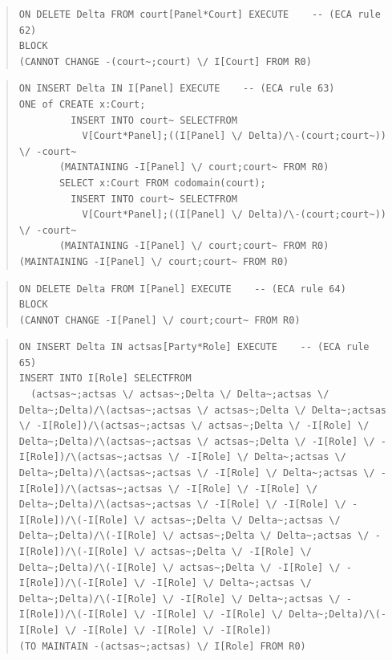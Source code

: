 \documentclass[10pt,a4paper]{report}              %
\theoremstyle{plain}\theorembodyfont{\rmfamily}\newtheorem{definition}{Definition}[section]
\theoremstyle{plain}\theorembodyfont{\rmfamily}\newtheorem{designrule}[definition]{Requirement}
\begin{document}
\begin{quote}
\begin{verbatim}
ON DELETE Delta FROM court[Panel*Court] EXECUTE    -- (ECA rule 62)
BLOCK
(CANNOT CHANGE -(court~;court) \/ I[Court] FROM R0)
\end{verbatim}
\end{quote}
\begin{quote}
\begin{verbatim}
ON INSERT Delta IN I[Panel] EXECUTE    -- (ECA rule 63)
ONE of CREATE x:Court;
         INSERT INTO court~ SELECTFROM
           V[Court*Panel];((I[Panel] \/ Delta)/\-(court;court~)) \/ -court~
       (MAINTAINING -I[Panel] \/ court;court~ FROM R0)
       SELECT x:Court FROM codomain(court);
         INSERT INTO court~ SELECTFROM
           V[Court*Panel];((I[Panel] \/ Delta)/\-(court;court~)) \/ -court~
       (MAINTAINING -I[Panel] \/ court;court~ FROM R0)
(MAINTAINING -I[Panel] \/ court;court~ FROM R0)
\end{verbatim}
\end{quote}
\begin{quote}
\begin{verbatim}
ON DELETE Delta FROM I[Panel] EXECUTE    -- (ECA rule 64)
BLOCK
(CANNOT CHANGE -I[Panel] \/ court;court~ FROM R0)
\end{verbatim}
\end{quote}
\begin{quote}
\begin{verbatim}
ON INSERT Delta IN actsas[Party*Role] EXECUTE    -- (ECA rule 65)
INSERT INTO I[Role] SELECTFROM
  (actsas~;actsas \/ actsas~;Delta \/ Delta~;actsas \/ Delta~;Delta)/\(actsas~;actsas \/ actsas~;Delta \/ Delta~;actsas \/ -I[Role])/\(actsas~;actsas \/ actsas~;Delta \/ -I[Role] \/ Delta~;Delta)/\(actsas~;actsas \/ actsas~;Delta \/ -I[Role] \/ -I[Role])/\(actsas~;actsas \/ -I[Role] \/ Delta~;actsas \/ Delta~;Delta)/\(actsas~;actsas \/ -I[Role] \/ Delta~;actsas \/ -I[Role])/\(actsas~;actsas \/ -I[Role] \/ -I[Role] \/ Delta~;Delta)/\(actsas~;actsas \/ -I[Role] \/ -I[Role] \/ -I[Role])/\(-I[Role] \/ actsas~;Delta \/ Delta~;actsas \/ Delta~;Delta)/\(-I[Role] \/ actsas~;Delta \/ Delta~;actsas \/ -I[Role])/\(-I[Role] \/ actsas~;Delta \/ -I[Role] \/ Delta~;Delta)/\(-I[Role] \/ actsas~;Delta \/ -I[Role] \/ -I[Role])/\(-I[Role] \/ -I[Role] \/ Delta~;actsas \/ Delta~;Delta)/\(-I[Role] \/ -I[Role] \/ Delta~;actsas \/ -I[Role])/\(-I[Role] \/ -I[Role] \/ -I[Role] \/ Delta~;Delta)/\(-I[Role] \/ -I[Role] \/ -I[Role] \/ -I[Role])
(TO MAINTAIN -(actsas~;actsas) \/ I[Role] FROM R0)
\end{verbatim}
\end{quote}
\end{document}

